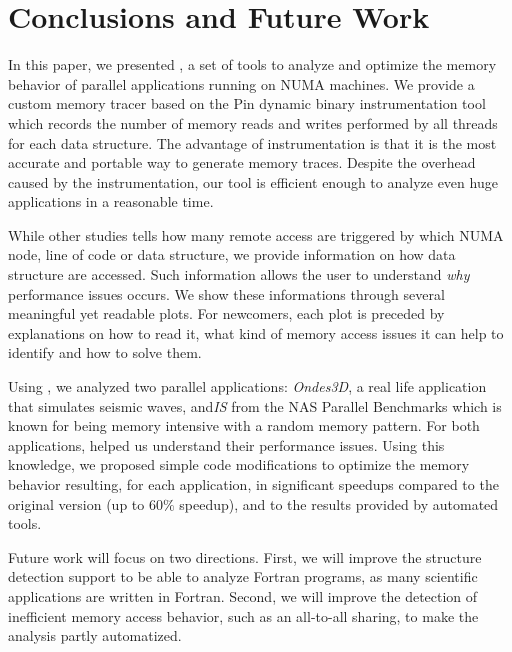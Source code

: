 
\section{Conclusions and Future Work}
\label{sec:concl}

In this paper, we presented \TABARNAC, a set of tools to analyze and
optimize the memory behavior of parallel applications running on NUMA
machines. We provide a custom memory tracer
based on the Pin dynamic binary instrumentation tool which records the
number of memory reads and writes performed by all threads for each data structure.
The advantage of instrumentation is that it is the most
accurate and portable way to generate memory traces.
Despite the overhead caused by the instrumentation, our tool is efficient enough to analyze even huge applications in a reasonable time.

While other studies tells how many remote access are triggered by which NUMA
node, line of code or data structure, we provide information on how data
structure are accessed. Such information allows the user to understand
\emph{why} performance issues occurs. We show these informations through
several  meaningful yet readable plots. For newcomers, each plot is preceded by explanations
on how to read it, what kind of memory access issues it can help to identify
and how to solve them.

Using \TABARNAC, we analyzed two parallel applications: \emph{Ondes3D}, a real life application that
simulates seismic waves, and\emph{IS} from the NAS
Parallel Benchmarks which is known for being memory intensive with a random
memory pattern. For both applications, \TABARNAC helped us
understand their performance issues.  Using this knowledge, we proposed
simple code modifications to optimize the memory behavior resulting, for each
application, in significant speedups compared to the original version (up to
$60\%$ speedup), and to the results provided by automated tools.

Future work will focus on two directions. First, we will improve the
structure detection support to be able to analyze Fortran programs, as many
scientific applications are written in Fortran. Second, we will improve the
detection of inefficient memory access behavior, such as an all-to-all
sharing, to make the analysis partly automatized.
